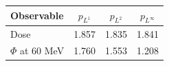 \begin{tabular}{lccc}
\toprule
Observable & $p_{L^1}$ & $p_{L^2}$ & $p_{L^\infty}$ \\
\midrule
Dose & 1.857 & 1.835 & 1.841 \\
$\Phi$ at 60 MeV & 1.760 & 1.553 & 1.208 \\
\bottomrule
\end{tabular}
